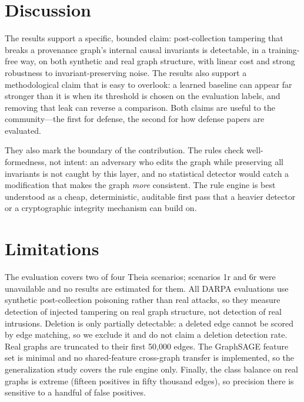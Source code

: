 \documentclass[journal]{IEEEtran}
\begin{document}
\section{Discussion}
The results support a specific, bounded claim: post-collection tampering that
breaks a provenance graph's internal causal invariants is detectable, in a
training-free way, on both synthetic and real graph structure, with linear cost
and strong robustness to invariant-preserving noise. The results also support a
methodological claim that is easy to overlook: a learned baseline can appear far
stronger than it is when its threshold is chosen on the evaluation labels, and
removing that leak can reverse a comparison. Both claims are useful to the
community---the first for defense, the second for how defense papers are
evaluated.

They also mark the boundary of the contribution. The rules check
well-formedness, not intent: an adversary who edits the graph while preserving
all invariants is not caught by this layer, and no statistical detector would
catch a modification that makes the graph \emph{more} consistent. The rule engine
is best understood as a cheap, deterministic, auditable first pass that a
heavier detector or a cryptographic integrity mechanism can build on.

\section{Limitations}
The evaluation covers two of four Theia scenarios; scenarios 1r and 6r were
unavailable and no results are estimated for them. All DARPA evaluations use
synthetic post-collection poisoning rather than real attacks, so they measure
detection of injected tampering on real graph structure, not detection of real
intrusions. Deletion is only partially detectable: a deleted edge cannot be
scored by edge matching, so we exclude it and do not claim a deletion detection
rate. Real graphs are truncated to their first 50{,}000 edges. The GraphSAGE
feature set is minimal and no shared-feature cross-graph transfer is
implemented, so the generalization study covers the rule engine only. Finally,
the class balance on real graphs is extreme (fifteen positives in fifty thousand
edges), so precision there is sensitive to a handful of false positives.
\end{document}
